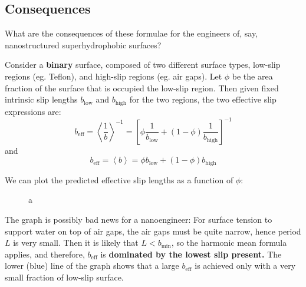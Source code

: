 \documentclass[12pt, a4paper, twoside, openright]{book}
\newcommand{\beff}{\ensuremath{b_{\mathrm{eff}}}}
\newcommand{\bmin}{\ensuremath{b_{\mathrm{min}}}}
\newcommand{\blo}{\ensuremath{b_{\mathrm{low}}}}
\newcommand{\bhi}{\ensuremath{b_{\mathrm{high}}}}
\begin{document}

\subsection*{Consequences}

What are the consequences of these formulae for the engineers of, say, nanostructured superhydrophobic surfaces?

Consider a \textbf{binary} surface, composed of two different surface types, low-slip regions (eg. Teflon), and high-slip regions (eg. air gaps).  Let $\phi$ be the area fraction of the surface that is occupied the low-slip region.  
Then given fixed intrinsic slip lengths $\blo$ and $\bhi$ for the two regions, the two effective slip expressions are:
\begin{equation}
\beff = \left< \frac{1}{b} \right>^{-1} =
\left[ \phi \frac{1}{\blo} + (1-\phi) \frac{1}{\bhi} \right]^{-1}
\end{equation}
and
\begin{equation}
\beff = \left< b \right> = \phi \blo + (1-\phi) \bhi 
\end{equation}

\clearpage
We can plot the predicted effective slip lengths as a function of $\phi$:

\begin{figure}[ht]
\centering
{}
\caption{a}\label{a}
\end{figure}

The graph is possibly bad news for a nanoengineer: For surface tension to support water on top of air gaps, the air gaps must be quite narrow, hence period $L$ is very small.  Then it is likely that $L < \bmin$, so the harmonic mean formula applies, and therefore, $\beff$ is \textbf{dominated by the lowest slip present.}  The lower (blue) line of the graph shows that a large $\beff$ is achieved only with a very small fraction of low-slip surface.
\end{document}
